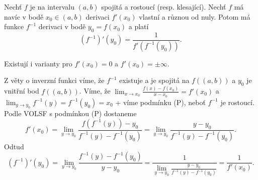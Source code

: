 \documentclass[12pt]{article}					%
\begin{document}
        \begin{veta}
            Nechť $f$ je na intervalu $(a, b)$ spojitá a rostoucí (resp. klesající). Nechť $f$ má navíc v bodě $x_0 \in (a, b)$ derivaci $f'(x_0)$ vlastní a různou od nuly. Potom má funkce $f^{-1}$ derivaci v bodě $y_0 = f(x_0)$ a platí
            $$ (f^{-1})'(y_0) = \frac{1}{f'(f^{-1}(y_0))}. $$

            \begin{poznamkain}
                Existují i varianty pro $f'(x_0) = 0$ a $f'(x_0) = ±∞$.
            \end{poznamkain}

            \begin{dukazin}
                Z věty o inverzní funkci víme, že $f^{-1}$ existuje a je spojitá na $f((a, b))$ a $y_0$ je vnitřní bod $f((a, b))$. Víme, že $\lim_{x \rightarrow x_0} \frac{f(x) - f(x_0)}{x-x_0} = f'(x_0)$ a $\lim_{y \rightarrow y_0} f^{-1}(y) = f^{-1}(y_0) = x_0$ + víme podmínku (P), neboť $f^{-1}$ je rostoucí. Podle VOLSF s podmínkou (P) dostaneme
                $$f'(x_0) = \lim_{y \rightarrow y_0} \frac{f(f^{-1}(y))-y_0}{f^{-1}(y) - f^{-1}(y_0)} = \lim_{y \rightarrow y_0} \frac{y - y_0}{f^{-1}(y) - f^{-1}(y_0)}.$$
                Odtud
                $$ (f^{-1})'(y_0) = \lim_{y \rightarrow y_0} \frac{f^{-1}(y) - f^{-1}(y_0)}{y - y_0} = \frac{1}{\lim_{y \rightarrow y_0} \frac{y - y_0}{f^{-1}(y) - f^{-1}(y_0)}} = \frac{1}{f'(x_0)}. $$ 
            \end{dukazin}
        \end{veta}
\end{document}
